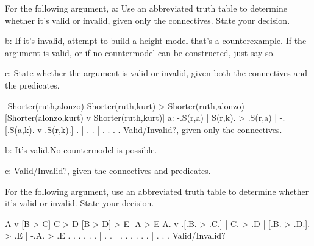\endproblems

For the following argument,
\list
a: Use an abbreviated truth table to determine whether it's valid or invalid, given only the connectives. State your decision.

b: If it's invalid, attempt to build a height model that's a counterexample. If the argument is valid, or if no countermodel can be constructed, just say so.

c: State whether the argument is valid or invalid, given both the connectives and the predicates.
\endlist

\problems
{}
\argument
 -Shorter(ruth,alonzo)
 Shorter(ruth,kurt) > Shorter(ruth,alonzo)
\argumentline
 -[Shorter(alonzo,kurt) v Shorter(ruth,kurt)]
\endargument
	\answerlist
	a:
	\truthtable
	 -.S(r,a) | S(r,k). > .S(r,a) | -.[.S(a,k). v .S(r,k).]
	\truthtableline
	  .       |       .   .       |  . .      .   .
	\endtruthtable
	Valid/Invalid?, given only the connectives.

	b: It's valid.\OR No countermodel is possible.\OR
	\heightmodel
	 
	\endheightmodel

	c: Valid/Invalid?, given the connectives and predicates.
	\endanswerlist

\endproblems

For the following argument, use an abbreviated truth table to determine whether it's valid or invalid. State your decision.

\problems
{}
\argument
 A v [B > C]
 C > D
 [B > D] > E
\argumentline
 -A > E
\endargument
	\answer
	\truthtable
	 A. v .[.B. > .C.] | C. > .D | [.B. > .D.]. > .E | -.A. > .E
	\truthtableline
	  .   . . .   . .  |  .   .  |  . .   . . .   .  |  . .   .
	\endtruthtable
	Valid/Invalid?
	\endanswer

\endproblems
\bye
